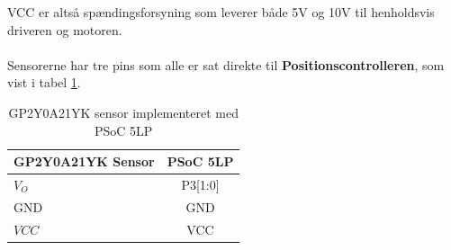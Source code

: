 \noindent
VCC er altså spændingsforsyning som leverer både 5V og 10V til henholdsvis driveren og motoren.
\\
\\
Sensorerne har tre pins som alle er sat direkte til \textbf{Positionscontrolleren}, som vist i tabel \ref{tab:Sensor_pin_konfigurering}.

\begin{table}[H]
  \centering
\begin{tabular}{ |l|c| }
  \hline
  \textbf{GP2Y0A21YK Sensor} & \textbf{PSoC 5LP}\\
  \hline 
  $V_O$ & P3[1:0] \\
  \hline 
  GND & GND \\
  \hline 
  $VCC$ & VCC \\
  \hline 
\end{tabular}
\caption{GP2Y0A21YK sensor implementeret med PSoC 5LP}\label{tab:Sensor_pin_konfigurering}
\end{table}